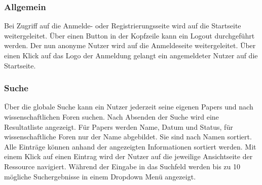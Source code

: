 \subsubsection{Allgemein}
\begin{description}
     Bei Zugriff auf die Anmelde- oder Registrierungsseite
    wird auf die Startseite weitergeleitet.
     Über einen Button in der Kopfzeile kann ein Logout durchgeführt werden.
    Der nun anonyme Nutzer wird auf die Anmeldeseite weitergeleitet.
     Über einen Klick auf das Logo der Anmeldung gelangt ein angemeldeter Nutzer auf die
    Startseite.
\end{description}

\subsubsection{Suche}
\begin{description}
     Über die globale Suche kann ein Nutzer jederzeit seine eigenen Papers und nach wissenschaftlichen Foren
    suchen. Nach Absenden der Suche wird eine Resultatliste angezeigt. Für Papers werden Name, Datum und Status, für
    wissenschaftliche Foren nur der Name abgebildet. %
    Sie sind nach Namen sortiert.
     Alle Einträge können anhand der angezeigten Informationen sortiert werden.
    Mit einem Klick auf einen Eintrag wird der Nutzer auf die jeweilige Ansichtseite
    der Ressource navigiert.
     Während der Eingabe in das Suchfeld werden bis zu 10 mögliche Suchergebnisse in
    einem Dropdown Menü angezeigt.
\end{description}

